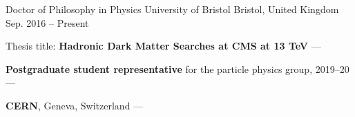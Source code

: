 
\begin{cventries}
    \cventry
        {Doctor of Philosophy in Physics} %
        {University of Bristol} %
        {Bristol, United Kingdom} %
        {Sep. 2016 -- Present} %
        {
        \begin{cvitems} %
            \item {Thesis title: \textbf{Hadronic Dark Matter Searches at CMS at 13 TeV} --- }
            \vspace{0.5mm}
            \item {\textbf{Postgraduate student representative} for the particle physics group, 2019--20 --- } %
            \vspace{0.5mm}
            \item {\textbf{CERN}, Geneva, Switzerland --- }
        \end{cvitems}
        }


\end{cventries}
